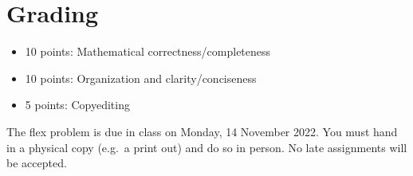 \section*{Grading}
\begin{itemize}
\item 10 points: Mathematical correctness/completeness
\item 10 points: Organization and clarity/conciseness
\item 5 points: Copyediting
\end{itemize}
The flex problem is due in class on Monday, 14 November 2022.  You must hand in a 
physical copy (e.g.\ a print out) and do so in person.  No late assignments will be
accepted.  
